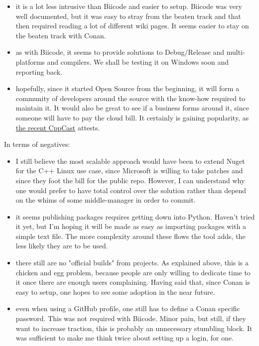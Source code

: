\documentclass{book}
\begin{document}
\begin{itemize}
\item it is a lot less intrusive than Biicode and easier to setup. Biicode
was very well documented, but it was easy to stray from the beaten
track and that then required reading a lot of different wiki
pages. It seems easier to stay on the beaten track with Conan.
\item as with Biicode, it seems to provide solutions to Debug/Release and
multi-platforms and compilers. We shall be testing it on Windows
soon and reporting back.
\item hopefully, since it started Open Source from the beginning, it will
form a community of developers around the source with the know-how
required to maintain it. It would also be great to see if a business
forms around it, since someone will have to pay the cloud bill. It
certainly is gaining popularity, as \href{http://cppcast.com/2016/05/diego-rodriguez-losada/}{the recent CppCast} attests.
\end{itemize}

In terms of negatives:

\begin{itemize}
\item I still believe the most scalable approach would have been to extend
Nuget for the C++ Linux use case, since Microsoft is willing to take
patches and since they foot the bill for the public repo. However,
I can understand why one would prefer to have total control over the
solution rather than depend on the whims of some middle-manager in
order to commit.
\item it seems publishing packages requires getting down into
Python. Haven't tried it yet, but I'm hoping it will be made as easy
as importing packages with a simple text file. The more complexity
around these flows the tool adds, the less likely they are to be
used.
\item there still are no "official builds" from projects. As explained
above, this is a chicken and egg problem, because people are only
willing to dedicate time to it once there are enough users
complaining. Having said that, since Conan is easy to setup, one
hopes to see some adoption in the near future.
\item even when using a GitHub profile, one still has to define a Conan
specific password. This was not required with Biicode. Minor pain,
but still, if they want to increase traction, this is probably an
unnecessary stumbling block. It was sufficient to make me think
twice about setting up a login, for one.
\end{itemize}
\end{document}
